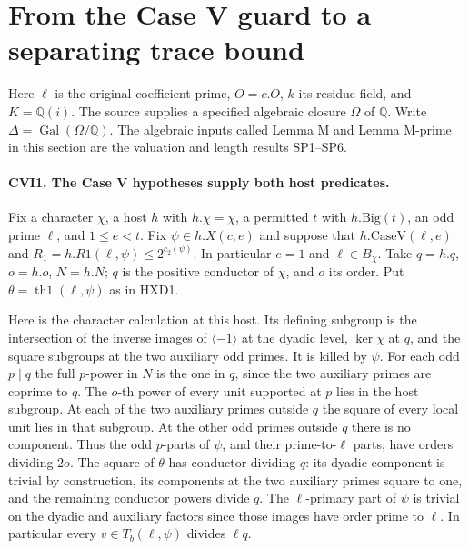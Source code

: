 \section{From the Case V guard to a separating trace bound}
\label{sec:count-v-install-v61}

Here $\ell$ is the original coefficient prime, $O=c.O$, $k$ its residue
field, and $K=\mathbb Q(i)$. The source supplies a specified algebraic closure $\Omega$ of $\mathbb Q$. Write
$\Delta=\operatorname{Gal}(\Omega/\mathbb Q)$.
The algebraic inputs called Lemma M and Lemma M-prime in this section
are the valuation and length results SP1--SP6.

\paragraph{CVI1. The Case V hypotheses supply both host predicates.}
\label{claim:CVI1}
Fix a character $\chi$, a host $h$ with $h.\chi=\chi$, a permitted
$t$ with $h.\mathrm{Big}(t)$, an odd prime $\ell$, and
$1\le e<t$. Fix $\psi\in h.X(c,e)$ and suppose that
$h.\mathrm{CaseV}(\ell,e)$ and
$R_1=h.R1(\ell,\psi)\le2^{c_2(\psi)}$.
In particular $e=1$ and $\ell\in B_\chi$. Take $q=h.q$, $o=h.o$,
$N=h.N$; $q$ is the positive conductor of $\chi$, and $o$ its order.
Put $\theta=\operatorname{th1}(\ell,\psi)$ as in HXD1.

Here is the character calculation at this host. Its defining subgroup
is the intersection of the inverse images of $\langle-1\rangle$ at
the dyadic level, $\ker\chi$ at $q$, and the square subgroups at the
two auxiliary odd primes. It is killed by $\psi$. For each odd
$p\mid q$ the full $p$-power in $N$ is the one in $q$, since the
two auxiliary primes are coprime to $q$. The $o$-th power of every
unit supported at $p$ lies in the host subgroup. At each of the two
auxiliary primes outside $q$ the square of every local unit lies in
that subgroup. At the other odd primes outside $q$ there is no
component. Thus the odd $p$-parts of $\psi$, and their prime-to-$\ell$
parts, have orders dividing $2o$. The square of $\theta$ has conductor
dividing $q$: its dyadic component is trivial by construction,
its components at the two auxiliary primes square to one, and the
remaining conductor powers divide $q$. The $\ell$-primary part of
$\psi$ is trivial on the dyadic and auxiliary factors since those
images have order prime to $\ell$. In particular every
$v\in T_b(\ell,\psi)$ divides $\ell q$.


